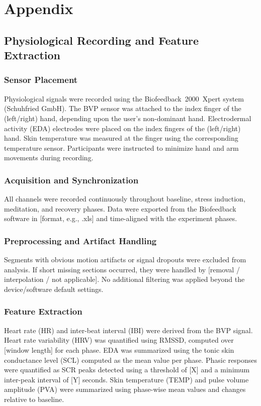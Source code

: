 
\chapter{Appendix}
\section{Physiological Recording and Feature Extraction}
\label{app:physio}

\subsection{Sensor Placement}
Physiological signals were recorded using the Biofeedback~2000~Xpert system (Schuhfried GmbH).
The BVP sensor was attached to the index finger of the (left/right) hand, depending upon the user's non-dominant hand.
Electrodermal activity (EDA) electrodes were placed on the index fingers of the (left/right) hand.
Skin temperature was measured at the finger using the corresponding temperature sensor.
Participants were instructed to minimize hand and arm movements during recording.

\subsection{Acquisition and Synchronization}
All channels were recorded continuously throughout baseline, stress induction, meditation, and recovery phases.
Data were exported from the Biofeedback software in [format, e.g., .xls] and time-aligned with the experiment phases.

\subsection{Preprocessing and Artifact Handling}
Segments with obvious motion artifacts or signal dropouts were excluded from analysis.
If short missing sections occurred, they were handled by [removal / interpolation / not applicable].
No additional filtering was applied beyond the device/software default settings. %

\subsection{Feature Extraction}
Heart rate (HR) and inter-beat interval (IBI) were derived from the BVP signal.
Heart rate variability (HRV) was quantified using RMSSD, computed over [window length] for each phase.
EDA was summarized using the tonic skin conductance level (SCL) computed as the mean value per phase.
Phasic responses were quantified as SCR peaks detected using a threshold of [X] and a minimum inter-peak interval of [Y] seconds. %
Skin temperature (TEMP) and pulse volume amplitude (PVA) were summarized using phase-wise mean values and changes relative to baseline.



